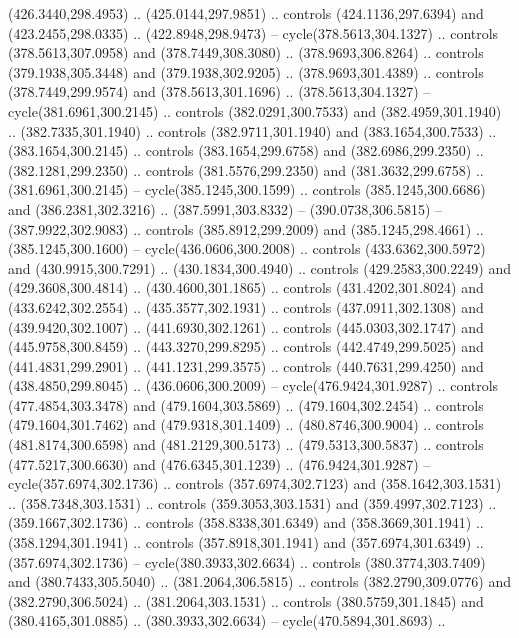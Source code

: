 \begin{scope}[cm={{1.25,0.0,0.0,-1.25,(0.0,743.43331)}}]
    (426.3440,298.4953) .. (425.0144,297.9851) .. controls (424.1136,297.6394) and
    (423.2455,298.0335) .. (422.8948,298.9473) -- cycle(378.5613,304.1327) ..
    controls (378.5613,307.0958) and (378.7449,308.3080) .. (378.9693,306.8264) ..
    controls (379.1938,305.3448) and (379.1938,302.9205) .. (378.9693,301.4389) ..
    controls (378.7449,299.9574) and (378.5613,301.1696) .. (378.5613,304.1327) --
    cycle(381.6961,300.2145) .. controls (382.0291,300.7533) and
    (382.4959,301.1940) .. (382.7335,301.1940) .. controls (382.9711,301.1940) and
    (383.1654,300.7533) .. (383.1654,300.2145) .. controls (383.1654,299.6758) and
    (382.6986,299.2350) .. (382.1281,299.2350) .. controls (381.5576,299.2350) and
    (381.3632,299.6758) .. (381.6961,300.2145) -- cycle(385.1245,300.1599) ..
    controls (385.1245,300.6686) and (386.2381,302.3216) .. (387.5991,303.8332) --
    (390.0738,306.5815) -- (387.9922,302.9083) .. controls (385.8912,299.2009) and
    (385.1245,298.4661) .. (385.1245,300.1600) -- cycle(436.0606,300.2008) ..
    controls (433.6362,300.5972) and (430.9915,300.7291) .. (430.1834,300.4940) ..
    controls (429.2583,300.2249) and (429.3608,300.4814) .. (430.4600,301.1865) ..
    controls (431.4202,301.8024) and (433.6242,302.2554) .. (435.3577,302.1931) ..
    controls (437.0911,302.1308) and (439.9420,302.1007) .. (441.6930,302.1261) ..
    controls (445.0303,302.1747) and (445.9758,300.8459) .. (443.3270,299.8295) ..
    controls (442.4749,299.5025) and (441.4831,299.2901) .. (441.1231,299.3575) ..
    controls (440.7631,299.4250) and (438.4850,299.8045) .. (436.0606,300.2009) --
    cycle(476.9424,301.9287) .. controls (477.4854,303.3478) and
    (479.1604,303.5869) .. (479.1604,302.2454) .. controls (479.1604,301.7462) and
    (479.9318,301.1409) .. (480.8746,300.9004) .. controls (481.8174,300.6598) and
    (481.2129,300.5173) .. (479.5313,300.5837) .. controls (477.5217,300.6630) and
    (476.6345,301.1239) .. (476.9424,301.9287) -- cycle(357.6974,302.1736) ..
    controls (357.6974,302.7123) and (358.1642,303.1531) .. (358.7348,303.1531) ..
    controls (359.3053,303.1531) and (359.4997,302.7123) .. (359.1667,302.1736) ..
    controls (358.8338,301.6349) and (358.3669,301.1941) .. (358.1294,301.1941) ..
    controls (357.8918,301.1941) and (357.6974,301.6349) .. (357.6974,302.1736) --
    cycle(380.3933,302.6634) .. controls (380.3774,303.7409) and
    (380.7433,305.5040) .. (381.2064,306.5815) .. controls (382.2790,309.0776) and
    (382.2790,306.5024) .. (381.2064,303.1531) .. controls (380.5759,301.1845) and
    (380.4165,301.0885) .. (380.3933,302.6634) -- cycle(470.5894,301.8693) ..

\end{scope}
